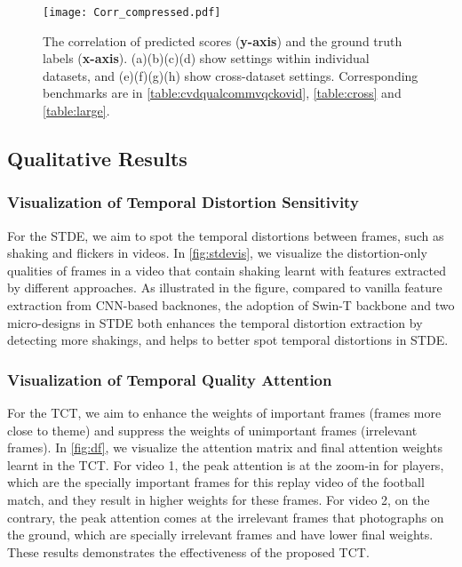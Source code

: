 \documentclass[journal]{IEEEtran}
\begin{document}
\begin{figure*}
    \centering
    \texttt{[image: Corr\_compressed.pdf]}
    \caption{The correlation of predicted scores (\textbf{y-axis}) and the ground truth labels (\textbf{x-axis}). (a)(b)(c)(d) show settings within individual datasets, and (e)(f)(g)(h) show cross-dataset settings. Corresponding benchmarks are in \cref{table:cvdqualcommvqckovid}, \cref{table:cross} and \cref{table:large}.}
    \label{fig:corr}
\end{figure*}

\subsection{Qualitative Results}
\label{sec:vis}

\subsubsection{Visualization of Temporal Distortion Sensitivity} 

For the STDE, we aim to spot the temporal distortions between frames, such as shaking and flickers in videos. In \cref{fig:stdevis}, we visualize the distortion-only qualities of frames in a video that contain shaking learnt with features extracted by different approaches. As illustrated in the figure, compared to vanilla feature extraction from CNN-based backnones, the adoption of Swin-T backbone and two micro-designs in STDE both enhances the temporal distortion extraction by detecting more shakings, and helps to better spot temporal distortions in STDE.


\subsubsection{Visualization of Temporal Quality Attention}


For the TCT, we aim to enhance the weights of important frames (frames more close to theme) and suppress the weights of unimportant frames (irrelevant frames). In \cref{fig:df}, we visualize the attention matrix  and final attention weights  learnt in the TCT. For video 1, the peak attention is at the zoom-in for players, which are the specially important frames for this replay video of the football match, and they result in higher weights for these frames. For video 2, on the contrary, the peak attention comes at the irrelevant frames that photographs on the ground, which are specially irrelevant frames and have lower final weights. These results demonstrates the effectiveness of the proposed TCT.
\end{document}
